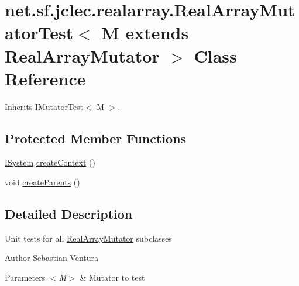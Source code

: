 \hypertarget{classnet_1_1sf_1_1jclec_1_1realarray_1_1_real_array_mutator_test_3_01_m_01extends_01_real_array_mutator_01_4}{\section{net.\-sf.\-jclec.\-realarray.\-Real\-Array\-Mutator\-Test$<$ M extends Real\-Array\-Mutator $>$ Class Reference}
\label{classnet_1_1sf_1_1jclec_1_1realarray_1_1_real_array_mutator_test_3_01_m_01extends_01_real_array_mutator_01_4}
}


Inherits I\-Mutator\-Test$<$ M $>$.

\subsection*{Protected Member Functions}
\begin{DoxyCompactItemize}
\item 
\hyperlink{interfacenet_1_1sf_1_1jclec_1_1_i_system}{I\-System} \hyperlink{classnet_1_1sf_1_1jclec_1_1realarray_1_1_real_array_mutator_test_3_01_m_01extends_01_real_array_mutator_01_4_a12c4c9befc15359f560d37f726e316b6}{create\-Context} ()
\item 
void \hyperlink{classnet_1_1sf_1_1jclec_1_1realarray_1_1_real_array_mutator_test_3_01_m_01extends_01_real_array_mutator_01_4_a9e10ffad3fcd2f0f8669ed4e872596dc}{create\-Parents} ()
\end{DoxyCompactItemize}


\subsection{Detailed Description}
Unit tests for all \hyperlink{classnet_1_1sf_1_1jclec_1_1realarray_1_1_real_array_mutator}{Real\-Array\-Mutator} subclasses

\begin{DoxyAuthor}{Author}
Sebastian Ventura
\end{DoxyAuthor}

\begin{DoxyParams}{Parameters}
{\em $<$\-M$>$} & Mutator to test \\
\hline
\end{DoxyParams}


